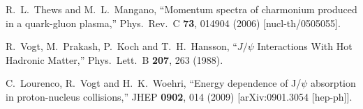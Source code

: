 \documentclass[aps,prc,preprint,superscriptaddress,showpacs,showkeys]{revtex4-1}
\begin{document}
\begin{thebibliography}{100}
  R.~L.~Thews and M.~L.~Mangano,
  ``Momentum spectra of charmonium produced in a quark-gluon plasma,''
  Phys.\ Rev.\ C {\bf 73}, 014904 (2006)
  [nucl-th/0505055].


  R.~Vogt, M.~Prakash, P.~Koch and T.~H.~Hansson,
  ``$J/\psi$ Interactions With Hot Hadronic Matter,''
  Phys.\ Lett.\ B {\bf 207}, 263 (1988).
 

  C.~Lourenco, R.~Vogt and H.~K.~Woehri,
  ``Energy dependence of J/$\psi$ absorption in proton-nucleus collisions,''
  JHEP {\bf 0902}, 014 (2009)
  [arXiv:0901.3054 [hep-ph]].

\end{thebibliography}
\end{document}
